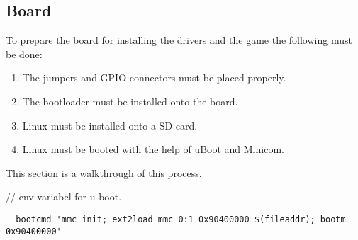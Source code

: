 \subsection{Board}

To prepare the board for installing the drivers and the game the following must be done:
\begin{enumerate}
  \item The jumpers and GPIO connectors must be placed properly.
  \item The bootloader must be installed onto the board.
  \item Linux must be installed onto a SD-card.
  \item Linux must be booted with the help of uBoot and Minicom.
\end{enumerate}

This section is a walkthrough of this process.


// env variabel for u-boot.
\begin{verbatim}
  bootcmd 'mmc init; ext2load mmc 0:1 0x90400000 $(fileaddr); bootm 0x90400000'
\end{verbatim}

